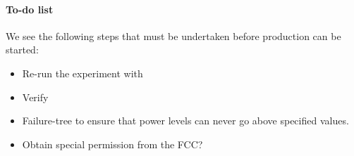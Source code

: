 \documentclass[fleqn,10pt]{article}
\begin{document}

	


\clearpage



\paragraph{To-do list}

We see the following steps that must be undertaken before production can be started:

\begin{itemize}
  \item Re-run the experiment with 
  \item Verify 
  \item Failure-tree to ensure that power levels can never go above specified values.
  \item Obtain special permission from the FCC?
\end{itemize}
\end{document}
